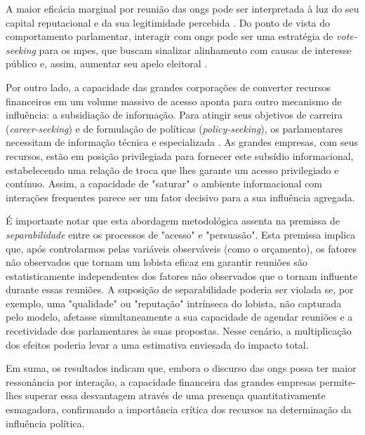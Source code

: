 A maior eficácia marginal por reunião das \acrshort{ong}s pode ser interpretada à luz do seu capital reputacional e da sua legitimidade percebida \cite{bunea2018legitimacy}. Do ponto de vista do comportamento parlamentar, interagir com \acrshort{ong}s pode ser uma estratégia de \textit{vote-seeking} para os \acrshort{mpe}s, que buscam sinalizar alinhamento com causas de interesse público e, assim, aumentar seu apelo eleitoral \cite{Ibenskas2021, mayhew2004congress}.

Por outro lado, a capacidade das grandes corporações de converter recursos financeiros em um volume massivo de acesso aponta para outro mecanismo de influência: a subsidiação de informação. Para atingir seus objetivos de carreira (\textit{career-seeking}) e de formulação de políticas (\textit{policy-seeking}), os parlamentares necessitam de informação técnica e especializada \cite{daniel2015career, kluver_informational_2012}. As grandes empresas, com seus recursos, estão em posição privilegiada para fornecer este subsídio informacional, estabelecendo uma relação de troca \cite{huwyler_no_2023} que lhes garante um acesso privilegiado e contínuo. Assim, a capacidade de "saturar" o ambiente informacional com interações frequentes parece ser um fator decisivo para a sua influência agregada.

É importante notar que esta abordagem metodológica assenta na premissa de \textit{separabilidade} entre os processos de "acesso" e "persuasão". Esta premissa implica que, após controlarmos pelas variáveis observáveis (como o orçamento), os fatores não observados que tornam um lobista eficaz em garantir reuniões são estatisticamente independentes dos fatores não observados que o tornam influente durante essas reuniões. A suposição de separabilidade poderia ser violada se, por exemplo, uma "qualidade" ou "reputação" intrínseca do lobista, não capturada pelo modelo, afetasse simultaneamente a sua capacidade de agendar reuniões e a recetividade dos parlamentares às suas propostas. Nesse cenário, a multiplicação dos efeitos poderia levar a uma estimativa enviesada do impacto total.

Em suma, os resultados indicam que, embora o discurso das \acrshort{ong}s possa ter maior ressonância por interação, a capacidade financeira das grandes empresas permite-lhes superar essa desvantagem através de uma presença quantitativamente esmagadora, confirmando a importância crítica dos recursos na determinação da influência política.